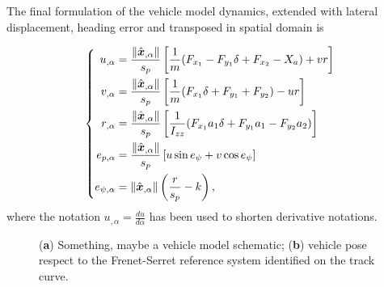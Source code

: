 \documentclass[conference]{IEEEtran} %
\renewcommand{\vec}[1]{\boldsymbol{#1}}
\DeclarePairedDelimiter{\norm}{\lVert}{\rVert}
\begin{document}
The final formulation of the vehicle model dynamics, %
extended with lateral displacement, heading error and transposed in spatial domain is

\begin{equation} \left\{
\begin{aligned}
  u_{,\alpha} &= \frac{\norm{\hat{\vec x}_{,\alpha}}}{s_p} \left[ \frac{1}{m} (F_{x_1} - F_{y_1} \delta + F_{x_2} - X_a) + vr \right] \\
  v_{,\alpha} &= \frac{\norm{\hat{\vec x}_{,\alpha}}}{s_p} \left[ \frac{1}{m} (F_{x_1} \delta + F_{y_1} + F_{y_2}) - ur \right] \\
  r_{,\alpha} &= \frac{\norm{\hat{\vec x}_{,\alpha}}}{s_p} \left[ \frac{1}{I_{zz}} (F_{x_1} a_1 \delta + F_{y_1} a_1 - F_{y_2} a_2) \right] \\
  e_{p,\alpha} &= \frac{\norm{\hat{\vec x}_{,\alpha}}}{s_p} \left[ u \sin{e_\psi} + v \cos{e_\psi} \right] \\
  e_{\psi,\alpha} &= \norm{\hat{\vec x}_{,\alpha}} \left( \frac{r}{s_p} - k \right),
\end{aligned} \right.
\label{eq:vehicle_state_update_alpha_domain}
\end{equation}
%
where the notation $u_{,\alpha} = \frac{du}{d \alpha}$ has been used to shorten derivative notations.

\begin{figure}[htb] \centering
  \caption{(\textbf{a}) Something, maybe a vehicle model schematic; (\textbf{b}) vehicle pose respect to the Frenet-Serret reference system identified on the track curve.}
  \label{fig:scheme_frenet_serret}
\end{figure}

\end{document}
